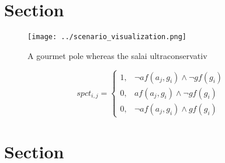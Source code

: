 \documentclass[a4paper]{article}
\begin{document}
\section{Section}

\begin{figure}
\centering
\texttt{[image: ../scenario\_visualization.png]}
\caption{A gourmet pole whereas the salai ultraconservativ
}
\end{figure}
 
\begin{equation}
spct_{i,j} =
\begin{cases}
1, & \text{$\neg af(a_j,g_i) \wedge \neg gf(g_i)$}\\
0, & \text{$af(a_j,g_i) \wedge \neg gf(g_i)$}\\
0, & \text{$\neg af(a_j,g_i) \wedge gf(g_i)$}
\end{cases}
\end{equation}

\section{Section}
\end{document}

